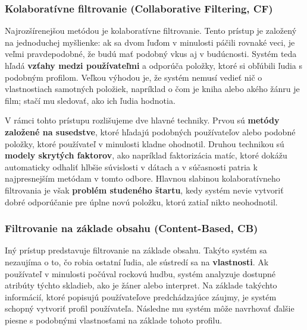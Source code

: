 \subsubsection{Kolaboratívne filtrovanie (Collaborative Filtering, CF)}

Najrozšírenejšou metódou je kolaboratívne filtrovanie. Tento prístup je založený na jednoduchej myšlienke: ak sa dvom ľuďom v minulosti páčili rovnaké veci, je veľmi pravdepodobné, že budú mať podobný vkus aj v budúcnosti.\cite{Jannach, Ricci} Systém teda hľadá \textbf{vzťahy medzi používateľmi} a odporúča položky, ktoré si obľúbili ľudia s podobným profilom. Veľkou výhodou je, že systém nemusí vedieť nič o vlastnostiach samotných položiek, napríklad o čom je kniha alebo akého žánru je film; stačí mu sledovať, ako ich ľudia hodnotia.\cite{Jannach, Ricci}

V rámci tohto prístupu rozlišujeme dve hlavné techniky. Prvou sú \textbf{metódy založené na susedstve}, ktoré hľadajú podobných používateľov alebo podobné položky, ktoré používateľ v minulosti kladne ohodnotil.\cite{Ricci}
Druhou technikou sú \textbf{modely skrytých faktorov}, ako napríklad faktorizácia matíc, ktoré dokážu automaticky odhaliť hlbšie súvislosti v dátach a v súčasnosti patria k najpresnejším metódam v tomto odbore.\cite{Ricci} Hlavnou slabinou kolaboratívneho filtrovania je však \textbf{problém studeného štartu}, kedy systém nevie vytvoriť dobré odporúčanie pre úplne novú položku, ktorú zatiaľ nikto neohodnotil.\cite{Ricci}


\subsubsection{Filtrovanie na základe obsahu (Content-Based, CB)}

Iný prístup predstavuje filtrovanie na základe obsahu. Takýto systém sa nezaujíma o to, čo robia ostatní ľudia, ale sústredí sa na \textbf{vlastnosti}. %
Ak používateľ v minulosti počúval rockovú hudbu, systém analyzuje dostupné atribúty týchto skladieb, ako je žáner alebo interpret.\cite{Jannach, Aggarwal} Na základe takýchto informácií, ktoré popisujú používateľove predchádzajúce záujmy, je systém schopný vytvoriť profil používateľa. Následne mu systém môže navrhovať ďalšie piesne s podobnými vlastnosťami na základe tohoto profilu.\cite{Jannach, Aggarwal}

